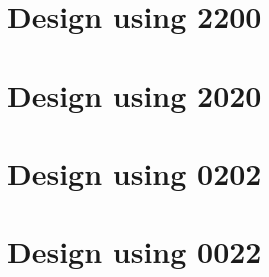 \section{Design using 2200}


 \begin{center}




 \end{center}



\section{Design using 2020}


 \begin{center}




 \end{center}



\section{Design using 0202}


 \begin{center}




 \end{center}



\section{Design using 0022}

